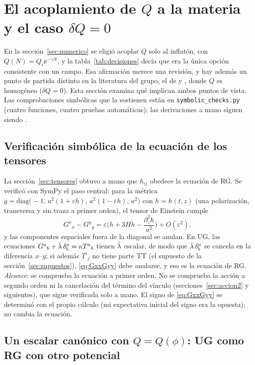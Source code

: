 \section{El acoplamiento de $Q$ a la materia y el caso $\delta Q=0$}
\label{sec:acoplamiento}

En la sección~\ref{sec:numerico} se eligió acoplar $Q$ solo al inflatón, con $Q(N)=Q_i\ee^{-\gamma N}$, y la tabla~\ref{tab:decisiones} decía que era la única opción consistente con un campo. Esa afirmación merece una revisión, y hay además un punto de partida distinto en la literatura del grupo, el de \cite{leon22} y \cite{piccirilli23}, donde $Q$ es homogéneo ($\delta Q=0$). Esta sección examina qué implican ambos puntos de vista. Las comprobaciones simbólicas que la sostienen están en \texttt{symbolic\_checks.py} (cuatro funciones, cuatro pruebas automáticas); las derivaciones a mano siguen siendo .

\subsection{Verificación simbólica de la ecuación de los tensores}
\label{sec:simbTT}

La sección~\ref{sec:tensores} obtuvo a mano que $h_{ij}$ obedece la ecuación de RG. Se verificó con SymPy el paso central: para la métrica $g=\mathrm{diag}\big(-1,\,a^2(1+\varepsilon h),\,a^2(1-\varepsilon h),\,a^2\big)$ con $h=h(t,z)$ (una polarización, transversa y sin traza a primer orden), el tensor de Einstein cumple
\begin{equation}
G^x{}_x-G^y{}_y=\varepsilon\Big(\ddot h+3H\dot h-\frac{\partial_z^2h}{a^2}\Big)+O(\varepsilon^2),
\label{eq:GxxGyy}
\end{equation}
y las componentes espaciales fuera de la diagonal se anulan. En UG, las ecuaciones $G^a{}_b+\bar\lambda\,\delta^a_b=\kappa T^a{}_b$ tienen $\bar\lambda$ escalar, de modo que $\bar\lambda\,\delta^a_b$ se cancela en la diferencia $x$--$y$; si además $T^i{}_j$ no tiene parte TT (el supuesto de la sección~\ref{sec:supuestos}), \eqref{eq:GxxGyy} debe anularse, y eso es la ecuación de RG. \emph{Alcance}: se comprueba la ecuación a primer orden. No se comprueba la acción a segundo orden ni la cancelación del término del vínculo (secciones~\ref{sec:accion2} y siguientes), que sigue verificada solo a mano. El signo de \eqref{eq:GxxGyy} se determinó con el propio cálculo (mi expectativa inicial del signo era la opuesta); no cambia la ecuación.

\subsection{Un escalar canónico con $Q=Q(\phi)$: UG como RG con otro potencial}
\label{sec:unescalar}

